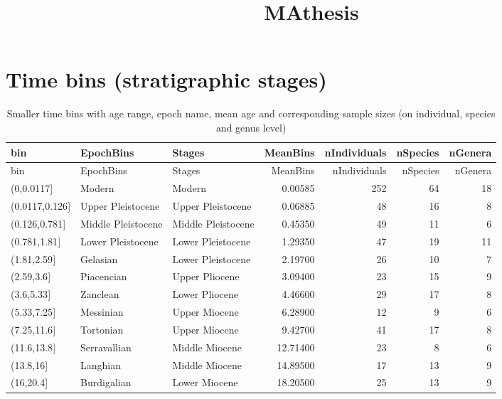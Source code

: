 \documentclass[]{article}
\title{MAthesis}
\author{}
\date{}
\begin{document}
\maketitle

{
\setcounter{tocdepth}{2}
\tableofcontents
}
\section{Time bins (stratigraphic
stages)}\label{time-bins-stratigraphic-stages}

\begin{longtable}[]{@{}lllrrrr@{}}
\caption{Smaller time bins with age range, epoch name, mean age and
corresponding sample sizes (on individual, species and genus
level)}\tabularnewline
\toprule
bin & EpochBins & Stages & MeanBins & nIndividuals & nSpecies &
nGenera\tabularnewline
\midrule
\endfirsthead
\toprule
bin & EpochBins & Stages & MeanBins & nIndividuals & nSpecies &
nGenera\tabularnewline
\midrule
\endhead
(0,0.0117{]} & Modern & Modern & 0.00585 & 252 & 64 & 18\tabularnewline
(0.0117,0.126{]} & Upper Pleistocene & Upper Pleistocene & 0.06885 & 48
& 16 & 8\tabularnewline
(0.126,0.781{]} & Middle Pleistocene & Middle Pleistocene & 0.45350 & 49
& 11 & 6\tabularnewline
(0.781,1.81{]} & Lower Pleistocene & Lower Pleistocene & 1.29350 & 47 &
19 & 11\tabularnewline
(1.81,2.59{]} & Gelasian & Lower Pleistocene & 2.19700 & 26 & 10 &
7\tabularnewline
(2.59,3.6{]} & Piacencian & Upper Pliocene & 3.09400 & 23 & 15 &
9\tabularnewline
(3.6,5.33{]} & Zanclean & Lower Pliocene & 4.46600 & 29 & 17 &
8\tabularnewline
(5.33,7.25{]} & Messinian & Upper Miocene & 6.28900 & 12 & 9 &
6\tabularnewline
(7.25,11.6{]} & Tortonian & Upper Miocene & 9.42700 & 41 & 17 &
8\tabularnewline
(11.6,13.8{]} & Serravallian & Middle Miocene & 12.71400 & 23 & 8 &
6\tabularnewline
(13.8,16{]} & Langhian & Middle Miocene & 14.89500 & 17 & 13 &
9\tabularnewline
(16,20.4{]} & Burdigalian & Lower Miocene & 18.20500 & 25 & 13 &
9\tabularnewline
\bottomrule
\end{longtable}
\end{document}
